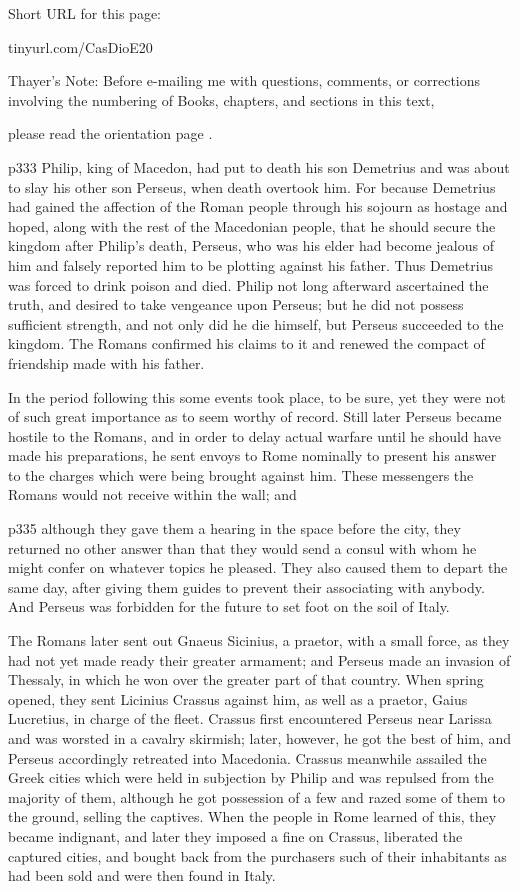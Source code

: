 Short URL for this page:

tinyurl.com/CasDioE20

Thayer's Note: Before e-mailing me with questions, comments, or corrections involving the numbering of Books, chapters, and sections in this text,

please read the orientation page .

p333
Philip, king of Macedon, had put to death his son Demetrius and was about to slay his other son Perseus, when death overtook him. For because Demetrius had gained the affection of the Roman people through his sojourn as hostage and hoped, along with the rest of the Macedonian people, that he should secure the kingdom after Philip's death, Perseus, who was his elder had become jealous of him and falsely reported him to be plotting against his father. Thus Demetrius was forced to drink poison and died. Philip not long afterward ascertained the truth, and desired to take vengeance upon Perseus; but he did not possess sufficient strength, and not only did he die himself, but Perseus succeeded to the kingdom. The Romans confirmed his claims to it and renewed the compact of friendship made with his father.

In the period following this some events took place, to be sure, yet they were not of such great importance as to seem worthy of record. Still later Perseus became hostile to the Romans, and in order to delay actual warfare until he should have made his preparations, he sent envoys to Rome nominally to present his answer to the charges which were being brought against him. These messengers the Romans would not receive within the wall; and

p335 although they gave them a hearing in the space before the city, they returned no other answer than that they would send a consul with whom he might confer on whatever topics he pleased. They also caused them to depart the same day, after giving them guides to prevent their associating with anybody. And Perseus was forbidden for the future to set foot on the soil of Italy.

The Romans later sent out Gnaeus Sicinius, a praetor, with a small force, as they had not yet made ready their greater armament; and Perseus made an invasion of Thessaly, in which he won over the greater part of that country. When spring opened, they sent Licinius Crassus against him, as well as a praetor, Gaius Lucretius, in charge of the fleet. Crassus first encountered Perseus near Larissa and was worsted in a cavalry skirmish; later, however, he got the best of him, and Perseus accordingly retreated into Macedonia. Crassus meanwhile assailed the Greek cities which were held in subjection by Philip and was repulsed from the majority of them, although he got possession of a few and razed some of them to the ground, selling the captives. When the people in Rome learned of this, they became indignant, and later they imposed a fine on Crassus, liberated the captured cities, and bought back from the purchasers such of their inhabitants as had been sold and were then found in Italy.

